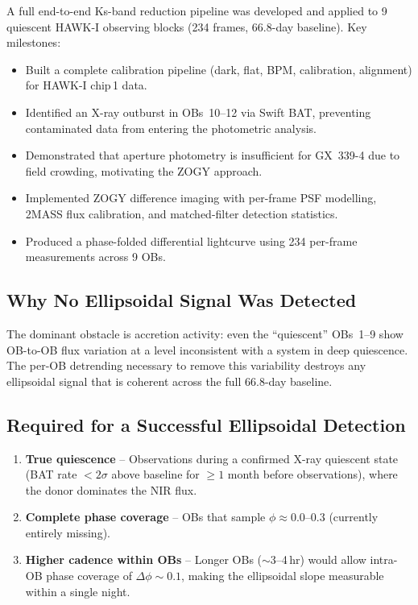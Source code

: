 \documentclass[12pt,a4paper]{article}
\begin{document}
A full end-to-end Ks-band reduction pipeline was developed and applied to
9 quiescent HAWK-I observing blocks (234 frames, 66.8-day baseline).  Key
milestones:

\begin{itemize}
  \item Built a complete calibration pipeline (dark, flat, BPM,
        calibration, alignment) for HAWK-I chip\,1 data.
  \item Identified an X-ray outburst in OBs~10--12 via Swift BAT,
        preventing contaminated data from entering the photometric analysis.
  \item Demonstrated that aperture photometry is insufficient for GX~339-4
        due to field crowding, motivating the ZOGY approach.
  \item Implemented ZOGY difference imaging with per-frame PSF modelling,
        2MASS flux calibration, and matched-filter detection statistics.
  \item Produced a phase-folded differential lightcurve using 234
        per-frame measurements across 9 OBs.
\end{itemize}

\subsection{Why No Ellipsoidal Signal Was Detected}

The dominant obstacle is accretion activity: even the ``quiescent'' OBs~1--9
show OB-to-OB flux variation at a level inconsistent with a system in deep
quiescence.  The per-OB detrending necessary to remove this variability
destroys any ellipsoidal signal that is coherent across the full
66.8-day baseline.

\subsection{Required for a Successful Ellipsoidal Detection}

\begin{enumerate}
  \item \textbf{True quiescence} -- Observations during a confirmed X-ray
        quiescent state (BAT rate $< 2\sigma$ above baseline for $\geq 1$
        month before observations), where the donor dominates the NIR flux.
  \item \textbf{Complete phase coverage} -- OBs that sample $\phi \approx
        0.0$--$0.3$ (currently entirely missing).
  \item \textbf{Higher cadence within OBs} -- Longer OBs ($\sim$3--4\,hr)
        would allow intra-OB phase coverage of $\Delta\phi \sim 0.1$,
        making the ellipsoidal slope measurable within a single night.
\end{enumerate}
\end{document}

